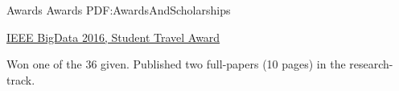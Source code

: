 
\Section
{Awards}
{Awards}
{PDF:AwardsAndScholarships}

\BulletItem
\href{http://cci.drexel.edu/bigdata/bigdata2016/StudentTravelAward.html}{
IEEE BigData 2016, Student Travel Award}
\hfill
{}
\begin{Detail}
	\SubBulletItem
	Won one of the 36 given.
	\SubBulletItem
	Published two full-papers (10 pages) in the research-track.
\end{Detail}